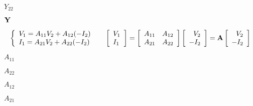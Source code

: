 {\newpage\clearpage
{}%
$Y_{22}$%
\lthtmlinlinemathZ
\lthtmlcheckvsize\clearpage}

{\newpage\clearpage
{}%
${\bf Y}$%
\lthtmlinlinemathZ
\lthtmlcheckvsize\clearpage}

{\newpage\clearpage
{}%
\begin{displaymath}\left\{ \begin{array}{l} 
    V_1=A_{11}V_2+A_{12}(-I_2) \\
    I_1=A_{21}V_2+A_{22}(-I_2) \end{array} \right.\;\;\;\;\;
  \left[ \begin{array}{l} V_1 \\I_1\end{array} \right]=
  \left[ \begin{array}{ll} A_{11} & A_{12}\\A_{21} & A_{22}\end{array}\right]
  \left[ \begin{array}{r} V_2 \\-I_2\end{array} \right]
  ={\bf A}\left[ \begin{array}{r} V_2 \\-I_2\end{array} \right]  \end{displaymath}%
\lthtmldisplayZ
\lthtmlcheckvsize\clearpage}

{\newpage\clearpage
{}%
$A_{11}$%
\lthtmlinlinemathZ
\lthtmlcheckvsize\clearpage}

{\newpage\clearpage
{}%
$A_{22}$%
\lthtmlinlinemathZ
\lthtmlcheckvsize\clearpage}

{\newpage\clearpage
{}%
$A_{12}$%
\lthtmlinlinemathZ
\lthtmlcheckvsize\clearpage}

{\newpage\clearpage
{}%
$A_{21}$%
\lthtmlinlinemathZ
\lthtmlcheckvsize\clearpage}

